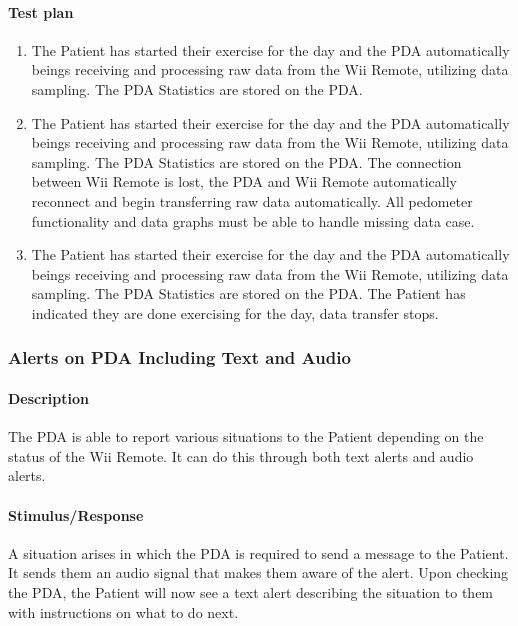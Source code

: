 \documentclass{article}
\begin{document}
\paragraph{Test plan}
\begin{enumerate}
\item The Patient has started their exercise for the day and the PDA automatically beings receiving and processing raw data from the Wii Remote, utilizing data sampling. The PDA Statistics are stored on the PDA.
\item The Patient has started their exercise for the day and the PDA automatically beings receiving and processing raw data from the Wii Remote, utilizing data sampling. The PDA Statistics are stored on the PDA. The connection between Wii Remote is lost, the PDA and Wii Remote automatically reconnect and begin transferring raw data automatically. All pedometer functionality and data graphs must be able to handle missing data case.
\item The Patient has started their exercise for the day and the PDA automatically beings receiving and processing raw data from the Wii Remote, utilizing data sampling. The PDA Statistics are stored on the PDA. The Patient has indicated they are done exercising for the day, data transfer stops.
\end{enumerate}


\subsubsection {Alerts on PDA Including Text and Audio}\label{sec: Alerts}
\paragraph{Description}
The PDA is able to report various situations to the Patient depending on the status of the Wii Remote. It can do this through both text alerts and audio alerts.

\paragraph {Stimulus/Response}
A situation arises in which the PDA is required to send a message to the Patient. It sends them an audio signal that makes them aware of the alert. Upon checking the PDA, the Patient will now see a text alert describing the situation to them with instructions on what to do next.
\end{document}

